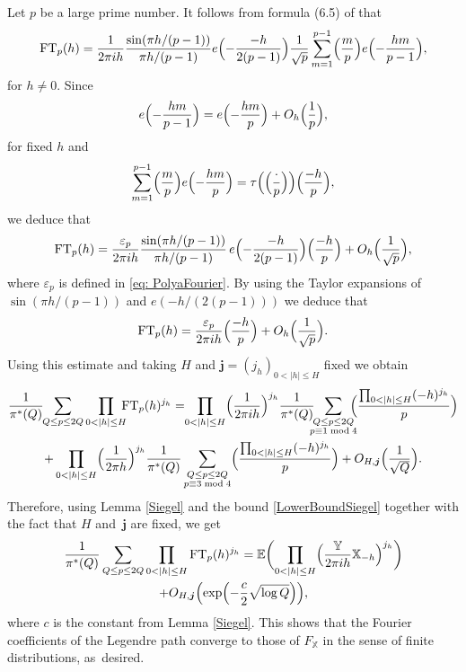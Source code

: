 \documentclass[JEP,XML,SOM,Unicode,NoFloatCountersInSection,published]{cedram}
\theoremstyle{plain}
\theoremstyle{definition}
\newcommand{\Legendre}[2]{\Bigl(\dfrac{#1}{#2}\Bigr)}
\let\ep\varepsilon
\newcommand{\X}{\mathbb{X}}
\newcommand{\Y}{\mathbb{Y}}
\newcommand{\ex}{\mathbb{E}}
\begin{document}
Let $p$ be a large prime number. It follows from formula (6.5) of \cite[Chap.\,6]{Ko} that
\[
\textup{FT}_p(h)=\frac{1}{2\pi i h}\frac{\sin(\pi h/(p-1))}{\pi h/(p-1)} e\Bigl(-\frac{-h}{2(p-1)}\Bigr) \frac{1}{\sqrt{p}} \sum_{m=1}^{p-1} \Legendre{m}{p} e\Bigl(-\frac{hm}{p-1}\Bigr), \]
for $h\neq 0$. Since
\[
e\Bigl(-\frac{hm}{p-1}\Bigr)= e\Bigl(-\frac{hm}{p}\Bigr) +O_h\Bigl(\frac{1}{p}\Bigr),\]
for fixed $h$ and
\[
\sum_{m=1}^{p-1} \Legendre{m}{p} e\Bigl(-\frac{hm}{p}\Bigr)= \tau\Bigl(\Legendre{\cdot}{p}\Bigr) \Legendre{-h}{p},\]
we deduce that
\[
\textup{FT}_p(h)= \frac{\varepsilon_p}{2\pi i h} \frac{\sin(\pi h/(p-1))}{\pi h/(p-1)}\, e\Bigl(-\frac{-h}{2(p-1)}\Bigr) \Legendre{-h}{p} +O_h\Bigl(\frac{1}{\sqrt{p}}\Bigr), \]
where $\ep_p$ is defined in \eqref{eq: PolyaFourier}. By using the Taylor expansions of $\sin(\pi h/(p-1))$ and $e(-h/(2(p-1)))$ we deduce that
\[\textup{FT}_p(h)= \frac{\ep_p}{2\pi i h}\Legendre{-h}{p} +O_h\Bigl(\frac{1}{\sqrt{p}}\Bigr). \]
Using this estimate and taking $H$ and $\boldsymbol{j}=(j_h)_{0<|h|\leq H}$ fixed we obtain
\begin{multline*}
\frac{1}{\pi^*(Q)}\hspace*{-1mm}\sum_{Q\leq p\leq 2Q} \prod_{0<|h|\leq H}\hspace*{-2mm}\textup{FT}_p (h)^{j_h}=\hspace*{-1mm} \prod_{0<|h|\leq H}\Bigl(\frac{1}{2\pi i h}\Bigr)^{j_h}\frac{1}{\pi^*(Q)}\hspace*{-2mm}\sum_{\substack{Q\leq p\leq 2Q\\ p\equiv 1 \bmod 4}}\hspace*{-2mm} \Legendre{\prod_{0<|h|\leq H} (-h)^{j_h}}{p}\\
+\prod_{0<|h|\leq H}\Bigl(\frac{1}{2\pi h}\Bigr)^{j_h}\frac{1}{\pi^*(Q)}\sum_{\substack{Q\leq p\leq 2Q\\ p\equiv 3 \bmod 4}} \Legendre{\prod_{0<|h|\leq H} (-h)^{j_h}}{p} +O_{H, \boldsymbol{j}}\Bigl(\frac{1}{\sqrt{Q}}\Bigr).
\end{multline*}
Therefore, using Lemma \ref{Siegel} and the bound \eqref{LowerBoundSiegel} together with the fact that $H$ and~$\boldsymbol{j}$ are fixed, we get
\begin{multline*}
\frac{1}{\pi^*(Q)}\sum_{Q\leq p\leq 2Q} \prod_{0<|h|\leq H}\textup{FT}_p (h)^{j_h}= \ex\biggl(\prod_{0<|h|\leq H}\Bigl(\frac{\Y}{2\pi i h} \X_{-h} \Bigr)^{j_h}\biggr) \\
+O_{H, \boldsymbol{j}}\Bigl(\exp\Bigl(-\frac c2 \sqrt{\log Q}\Bigr)\Bigr),
\end{multline*}
where $c$ is the constant from Lemma \ref{Siegel}. This shows that the Fourier coefficients of the Legendre path converge to those of $F_{\mathbb{X}}$ in the sense of finite distributions, as~desired.
\end{document}
